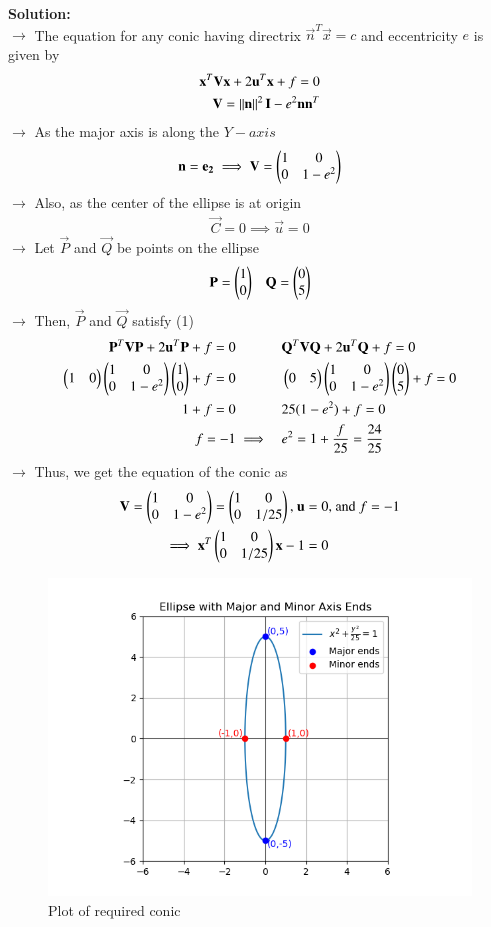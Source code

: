 \documentclass[journal]{IEEEtran}
\begin{document}
\textbf{Solution:}\\
$\rightarrow$ The equation for any conic having directrix $\vec{n}^T\vec{x}=c$ and eccentricity $e$ is given by
\begin{align}
    \mathbf{x}^T\mathbf{V}\mathbf{x} + 2\mathbf{u}^T\mathbf{x} + f = 0 \\
    \mathbf{V} = \left\lVert\mathbf{n}\right\rVert^2\mathbf{I}-e^2\mathbf{n}\mathbf{n}^T
\end{align}
$\rightarrow$ As the major axis is along the $Y-axis$
\begin{align} \mathbf{n} = \mathbf{e_2} \implies \mathbf{V} = \begin{pmatrix}1&0\\0&1-e^2\end{pmatrix} \end{align}
$\rightarrow$ Also, as the center of the ellipse is at origin
\begin{align} \vec{C} = 0 \implies \vec{u} = 0 \end{align}
$\rightarrow$ Let $\vec{P}$ and $\vec{Q}$ be points on the ellipse
\begin{align} \mathbf{P} = \begin{pmatrix}1\\0\end{pmatrix} && \mathbf{Q} = \begin{pmatrix}0\\5\end{pmatrix} \end{align}
$\rightarrow$ Then, $\vec{P}$ and $\vec{Q}$ satisfy (1)
\begin{align}
    \mathbf{P}^T\mathbf{V}\mathbf{P} + 2\mathbf{u}^T\mathbf{P} + f = 0& && \mathbf{Q}^T\mathbf{V}\mathbf{Q} + 2\mathbf{u}^T\mathbf{Q} + f = 0 \\
    \begin{pmatrix}1&0\end{pmatrix}\begin{pmatrix}1&0\\0&1-e^2\end{pmatrix}\begin{pmatrix}1\\0\end{pmatrix} + f = 0& && \begin{pmatrix}0&5\end{pmatrix}\begin{pmatrix}1&0\\0&1-e^2\end{pmatrix}\begin{pmatrix}0\\5\end{pmatrix} + f = 0 \\
    1 + f = 0& && 25(1-e^2) + f = 0\\
    f = -1& \implies && e^2 = 1+\frac{f}{25} = \frac{24}{25}
\end{align}
$\rightarrow$ Thus, we get the equation of the conic as
\begin{align}
    \mathbf{V}=\begin{pmatrix}1&0\\0&1-e^2\end{pmatrix}=\begin{pmatrix}1&0\\0&1/25\end{pmatrix} \text{, } \mathbf{u}&=0 \text{, and } f=-1\\
    \implies \mathbf{x}^T\begin{pmatrix}1&0\\0&1/25\end{pmatrix}\mathbf{x} - 1 &= 0
\end{align}
\begin{figure}[h!]
   \centering
   \includegraphics[width=0.65\linewidth]{figs/01.png}
   \caption{Plot of required conic}
   \label{Plot_1}
\end{figure}
\end{document}
